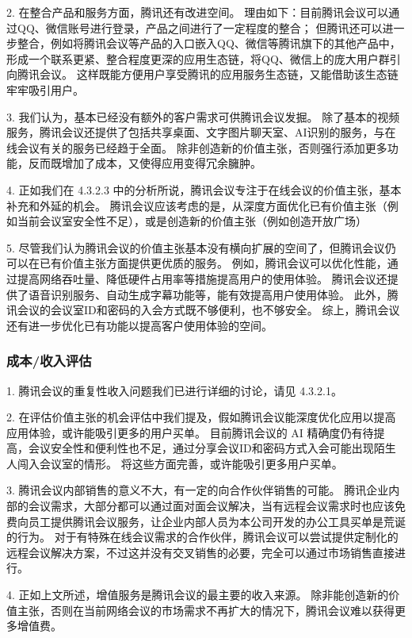 \documentclass[a4paper,12pt]{article}
\begin{document}
    2.
    在整合产品和服务方面，腾讯还有改进空间。
    理由如下：目前腾讯会议可以通过QQ、微信账号进行登录，产品之间进行了一定程度的整合；
    但腾讯还可以进一步整合，例如将腾讯会议等产品的入口嵌入QQ、微信等腾讯旗下的其他产品中，形成一个联系更紧、整合程度更深的应用生态链，将QQ、微信上的庞大用户群引向腾讯会议。
    这样既能方便用户享受腾讯的应用服务生态链，又能借助该生态链牢牢吸引用户。


    3.
    我们认为，基本已经没有额外的客户需求可供腾讯会议发掘。
    除了基本的视频服务，腾讯会议还提供了包括共享桌面、文字图片聊天室、AI识别的服务，与在线会议有关的服务已经趋于全面。
    除非创造新的价值主张，否则强行添加更多功能，反而既增加了成本，又使得应用变得冗余臃肿。


    4.
    正如我们在 4.3.2.3 中的分析所说，腾讯会议专注于在线会议的价值主张，基本补充和外延的机会。
    腾讯会议应该考虑的是，从深度方面优化已有价值主张（例如当前会议室安全性不足），或是创造新的价值主张（例如创造开放广场）


    5.
    尽管我们认为腾讯会议的价值主张基本没有横向扩展的空间了，但腾讯会议仍可以在已有价值主张方面提供更优质的服务。
    例如，腾讯会议可以优化性能，通过提高网络吞吐量、降低硬件占用率等措施提高用户的使用体验。
    腾讯会议还提供了语音识别服务、自动生成字幕功能等，能有效提高用户使用体验。
    此外，腾讯会议的会议室ID和密码的入会方式既不够便利，也不够安全。
    综上，腾讯会议还有进一步优化已有功能以提高客户使用体验的空间。


    \subsubsection{成本/收入评估}


    1.
    腾讯会议的重复性收入问题我们已进行详细的讨论，请见 4.3.2.1。


    2.
    在评估价值主张的机会评估中我们提及，假如腾讯会议能深度优化应用以提高应用体验，或许能吸引更多的用户买单。
    目前腾讯会议的 AI 精确度仍有待提高，会议安全性和便利性也不足，通过分享会议ID和密码方式入会可能出现陌生人闯入会议室的情形。
    将这些方面完善，或许能吸引更多用户买单。


    3.
    腾讯会议内部销售的意义不大，有一定的向合作伙伴销售的可能。
    腾讯企业内部的会议需求，大部分都可以通过面对面会议解决，当有远程会议需求时也应该免费向员工提供腾讯会议服务，让企业内部人员为本公司开发的办公工具买单是荒诞的行为。
    对于有特殊在线会议需求的合作伙伴，腾讯会议可以尝试提供定制化的远程会议解决方案，不过这并没有交叉销售的必要，完全可以通过市场销售直接进行。


    4.
    正如上文所述，增值服务是腾讯会议的最主要的收入来源。
    除非能创造新的价值主张，否则在当前网络会议的市场需求不再扩大的情况下，腾讯会议难以获得更多增值费。
\end{document}
